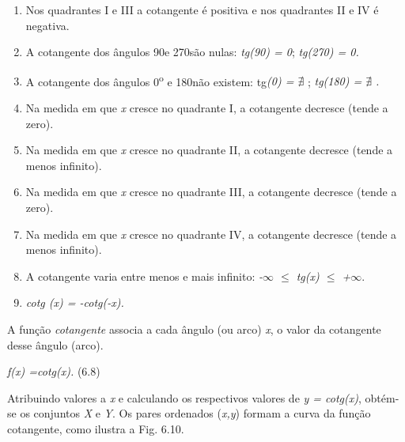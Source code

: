 \begin{caixa}
\begin{enumerate}
    \item Nos quadrantes I e III a cotangente é positiva e nos quadrantes II e IV é negativa.

    \item A cotangente dos ângulos 90\degree e 270\degree  são nulas:\textit{ tg(90\degree) = 0};  \textit{tg(270\degree) = 0.}

    \item A cotangente dos ângulos 0\textsuperscript{o} e 180\degree não existem: tg\textit{(0\degree) =  \(  \nexists  \) };  \textit{tg(180\degree) =  \(  \nexists  \) .}

    \item Na medida em que \textit{x} cresce no quadrante I, a cotangente decresce (tende a zero).

    \item Na medida em que \textit{x} cresce no quadrante II, a cotangente decresce (tende a menos infinito).

    \item Na medida em que \textit{x} cresce no quadrante III, a cotangente decresce (tende a zero).

    \item Na medida em que \textit{x} cresce no quadrante IV, a cotangente decresce (tende a menos infinito).

    \item A cotangente varia entre menos e mais infinito:   \textit{-$\infty $  $ \leq $  tg(x) $ \leq $  +$\infty$}.

    \item \textit{cotg (x) = -cotg(-x).}
\end{enumerate}
\end{caixa}

\begin{caixa}
A função \textit{cotangente} associa a cada ângulo (ou arco) \textit{x}, o valor da cotangente desse ângulo (arco).

\textit{f(x) =cotg(x).} \tab (6.8)
\end{caixa}

Atribuindo valores a \textit{x} e calculando os respectivos valores de \textit{y = cotg(x)}, obtém-se os conjuntos \textit{X }e\textit{ Y}. Os pares ordenados (\textit{x,y}) formam a curva da função cotangente, como ilustra a Fig. 6.10.

